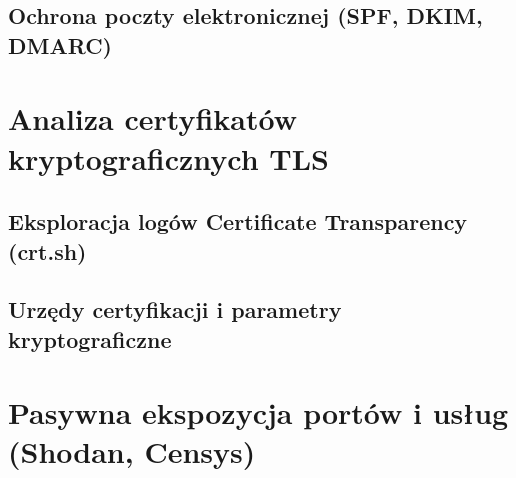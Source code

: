 \subsection{Ochrona poczty elektronicznej (SPF, DKIM, DMARC)}\label{subsec:ochrona-poczty-dmarc}

\section{Analiza certyfikatów kryptograficznych TLS}\label{sec:certyfikaty-tls}

\subsection{Eksploracja logów Certificate Transparency (crt.sh)}\label{subsec:ct-logs}

\subsection{Urzędy certyfikacji i parametry kryptograficzne}\label{subsec:analiza-certyfikatow}

\section{Pasywna ekspozycja portów i usług (Shodan, Censys)}\label{sec:shodan-censys}

